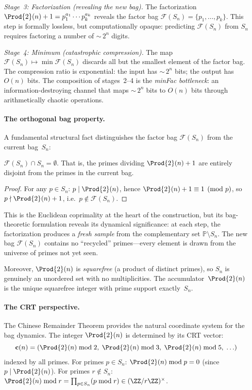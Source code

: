 \emph{Stage~3: Factorization (revealing the new bag).}  The factorization
$\Prod{2}(n)+1 = p_1^{a_1} \cdots p_k^{a_k}$ reveals the factor bag
$\mathcal{F}(S_n) = \{p_1, \ldots, p_k\}$.  This step is formally
lossless, but computationally opaque: predicting $\mathcal{F}(S_n)$ from
$S_n$ requires factoring a number of ${\sim}\, 2^n$ digits.

\emph{Stage~4: Minimum (catastrophic compression).}  The map
$\mathcal{F}(S_n) \mapsto \min \mathcal{F}(S_n)$ discards all but the
smallest element of the factor bag.  The compression ratio is
exponential: the input has ${\sim}\, 2^n$ bits; the output has $O(n)$
bits.  The composition of stages~2--4 is the \emph{minFac bottleneck}:
an information-destroying channel that maps ${\sim}\, 2^n$ bits to
$O(n)$ bits through arithmetically chaotic operations.

\paragraph{The orthogonal bag property.}
A fundamental structural fact distinguishes the factor bag
$\mathcal{F}(S_n)$ from the current bag~$S_n$:

\begin{proposition}
$\mathcal{F}(S_n) \cap S_n = \emptyset$.
That is, the primes dividing $\Prod{2}(n)+1$ are entirely disjoint from
the primes in the current bag.
\end{proposition}

\begin{proof}
For any $p \in S_n$: $p \mid \Prod{2}(n)$, hence
$\Prod{2}(n)+1 \equiv 1 \pmod{p}$, so $p \nmid \Prod{2}(n)+1$, i.e.\
$p \notin \mathcal{F}(S_n)$.
\end{proof}

This is the Euclidean coprimality at the heart of the construction, but
its bag-theoretic formulation reveals its dynamical significance: at each
step, the factorization produces a \emph{fresh sample} from the
complementary set $\mathbb{P} \setminus S_n$.  The new bag
$\mathcal{F}(S_n)$ contains no ``recycled'' primes---every element is
drawn from the universe of primes not yet seen.

Moreover, $\Prod{2}(n)$ is \emph{squarefree} (a product of distinct primes),
so $S_n$ is genuinely an unordered set with no multiplicities.  The
accumulator~$\Prod{2}(n)$ is the unique squarefree integer with prime
support exactly~$S_n$.

\paragraph{The CRT perspective.}
The Chinese Remainder Theorem provides the natural coordinate system for
the bag dynamics.  The integer $\Prod{2}(n)$ is determined by its CRT
vector:
\[
\mathbf{c}(n) = (\Prod{2}(n) \bmod 2,\;
\Prod{2}(n) \bmod 3,\; \Prod{2}(n) \bmod 5,\; \ldots)
\]
indexed by all primes.  For primes $p \in S_n$:
$\Prod{2}(n) \bmod p = 0$ (since $p \mid \Prod{2}(n)$).  For primes
$r \notin S_n$: $\Prod{2}(n) \bmod r = \prod_{p \in S_n} (p \bmod r)
\in (\ZZ/r\ZZ)^\times$.

